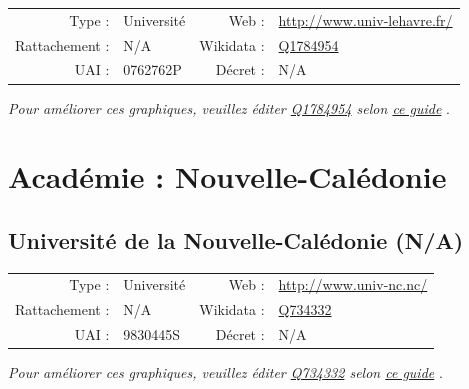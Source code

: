 \documentclass[11pt,french,landscape]{article}
\begin{document}
\begin{tabular*}{0.45\textwidth}{rp{2cm}rl}  
\hline  
Type : & Université & Web : &\href{http://www.univ-lehavre.fr/}{http://www.univ-lehavre.fr/} \\  
Rattachement : & N/A & Wikidata : & \href{https://www.wikidata.org/entity/Q1784954}{Q1784954} \\  
UAI : & 0762762P & Décret : & N/A \\  
\hline  
\end{tabular*}

\textit{\scriptsize Pour améliorer ces graphiques, veuillez éditer \href{https://www.wikidata.org/entity/Q1784954}{Q1784954}  selon \href{https://github.com/cpesr/wikidataESR/blob/master/Rmd/wikidataESR.md}{ce guide}}
.


\newpage

\hypertarget{acaduxe9mie-nouvelle-caluxe9donie}{%
\section{Académie :
Nouvelle-Calédonie}\label{acaduxe9mie-nouvelle-caluxe9donie}}

\hypertarget{universituxe9-de-la-nouvelle-caluxe9donie-na}{%
\subsection{Université de la Nouvelle-Calédonie
(N/A)}\label{universituxe9-de-la-nouvelle-caluxe9donie-na}}

\begin{tabular*}{0.45\textwidth}{rp{2cm}rl}  
\hline  
Type : & Université & Web : &\href{http://www.univ-nc.nc/}{http://www.univ-nc.nc/} \\  
Rattachement : & N/A & Wikidata : & \href{https://www.wikidata.org/entity/Q734332}{Q734332} \\  
UAI : & 9830445S & Décret : & N/A \\  
\hline  
\end{tabular*}

\textit{\scriptsize Pour améliorer ces graphiques, veuillez éditer \href{https://www.wikidata.org/entity/Q734332}{Q734332}  selon \href{https://github.com/cpesr/wikidataESR/blob/master/Rmd/wikidataESR.md}{ce guide}}
.

\end{document}
